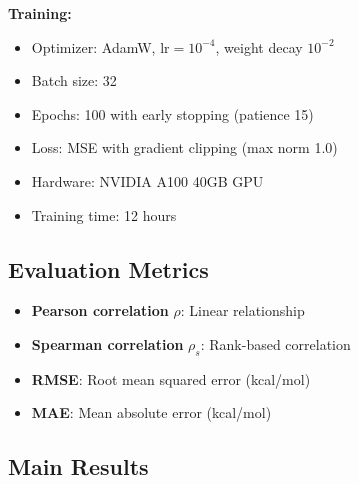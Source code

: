 \documentclass[12pt,en]{elegantpaper}
\begin{document}
\textbf{Training:}
\begin{itemize}
    \item Optimizer: AdamW, $\text{lr}=10^{-4}$, weight decay $10^{-2}$
    \item Batch size: 32
    \item Epochs: 100 with early stopping (patience 15)
    \item Loss: MSE with gradient clipping (max norm 1.0)
    \item Hardware: NVIDIA A100 40GB GPU
    \item Training time: 12 hours
\end{itemize}

\subsection{Evaluation Metrics}

\begin{itemize}
    \item \textbf{Pearson correlation} $\rho$: Linear relationship
    \item \textbf{Spearman correlation} $\rho_s$: Rank-based correlation
    \item \textbf{RMSE}: Root mean squared error (kcal/mol)
    \item \textbf{MAE}: Mean absolute error (kcal/mol)
\end{itemize}

\subsection{Main Results}
\end{document}
